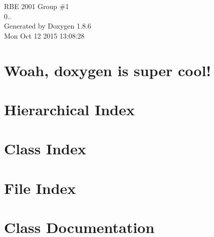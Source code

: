 \documentclass[twoside]{book}
\newcommand{\clearemptydoublepage}{%
  \newpage{\pagestyle{empty}\cleardoublepage}%
}
\begin{document}
\hypersetup{pageanchor=false}
\begin{titlepage}
\vspace*{7cm}
\begin{center}%
{\Large R\-B\-E 2001 Group \#1 \\[1ex]\large 0.. }\\
\vspace*{1cm}
{\large Generated by Doxygen 1.8.6}\\
\vspace*{0.5cm}
{\small Mon Oct 12 2015 13:08:28}\\
\end{center}
\end{titlepage}
\clearemptydoublepage
\tableofcontents
\clearemptydoublepage
{}
\hypersetup{pageanchor=true}

\chapter{Woah, doxygen is super cool!}
\label{index}\hypertarget{index}{}
\chapter{Hierarchical Index}

\chapter{Class Index}

\chapter{File Index}

\chapter{Class Documentation}




































\end{document}
